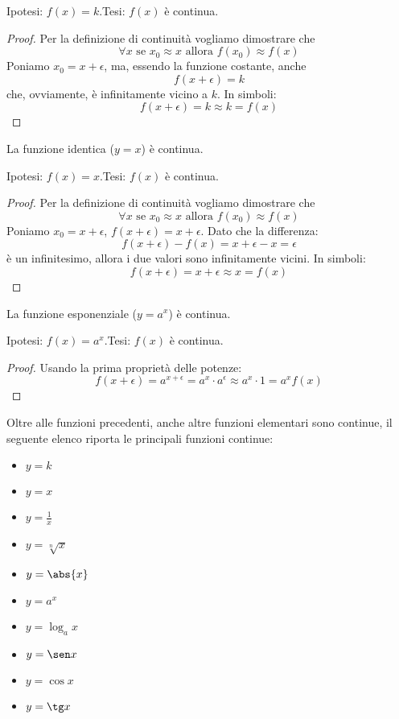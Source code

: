 \noindent Ipotesi: \(f(x)=k\).\tab Tesi: \(f(x)\) è continua.

\begin{proof}
Per la definizione di continuità vogliamo dimostrare che 
\[\forall x \text{ se } x_0 \approx x \text{ allora } f(x_0) \approx f(x)\]
Poniamo \(x_0=x+\epsilon\), ma, essendo la funzione costante, anche 
\[f(x+\epsilon)=k\] 
che, ovviamente, è infinitamente vicino a \(k\). In simboli:
\[f(x+\epsilon) = k \approx k = f(x)\] 
\end{proof}

\begin{teorema}
La funzione identica (\(y=x\)) è continua.
\end{teorema}

\noindent Ipotesi: \(f(x)=x\).\tab Tesi: \(f(x)\) è continua.

\begin{proof}
Per la definizione di continuità vogliamo dimostrare che 
\[\forall x \text{ se } x_0 \approx x \text{ allora } f(x_0) \approx f(x)\]
Poniamo \(x_0=x+\epsilon\), \(f(x+\epsilon)=x+\epsilon\). 
Dato che la differenza:
\[f(x+\epsilon)-f(x) = x+\epsilon-x= \epsilon\]
è un infinitesimo, allora i due valori sono infinitamente vicini. In simboli:
\[f(x+\epsilon) = x+\epsilon \approx x = f(x)\] 
\end{proof}

\begin{teorema}
La funzione esponenziale (\(y=a^x\)) è continua.
\end{teorema}

\noindent Ipotesi: \(f(x)=a^x\).\tab Tesi: \(f(x)\) è continua.

\begin{proof}
Usando la prima proprietà delle potenze:
\[f(x+\epsilon) =
a^{x+\epsilon} = a^{x} \cdot a^{\epsilon} \approx a^{x} \cdot 1 = a^{x}
f(x)\]
\end{proof}

Oltre alle funzioni precedenti, anche altre funzioni elementari sono continue, 
il seguente elenco riporta le principali funzioni continue:

\begin{itemize} [noitemsep]
 \item \(y=k\)
 \item \(y=x\)
 \item \(y=\frac{1}{x}\) \quad \textasteriskcentered
 \item \(y=\sqrt[n]{x}\) \quad \textasteriskcentered
 \item \(y=\abs{x}\)
 \item \(y=a^x\)
 \item \(y=\log_a x\) \quad \textasteriskcentered
 \item \(y=\sen x\)
 \item \(y=\cos x\)
 \item \(y=\tg x\) \quad \textasteriskcentered
\end{itemize}

